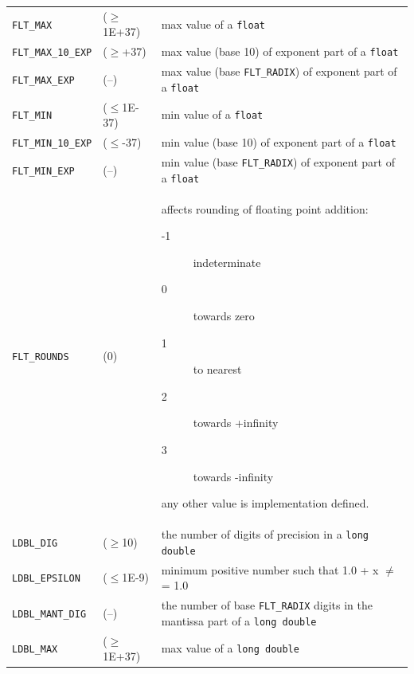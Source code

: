 \begin{tabular}{llp{\textwidth}}
     \texttt{FLT\_MAX} & ($\geq$1E+37) & max value of a \texttt{float}
    \\

     \texttt{FLT\_MAX\_10\_EXP} & ($\geq$+37) & max value (base 10) of exponent part of a \texttt{float}
    \\

     \texttt{FLT\_MAX\_EXP} & (--) & max value (base \texttt{FLT\_RADIX}) of exponent part of a
      \texttt{float}
    \\

     \texttt{FLT\_MIN} & ($\leq$1E-37) & min value of a \texttt{float}
    \\

     \texttt{FLT\_MIN\_10\_EXP} & ($\leq$-37) & min value (base 10) of exponent part of a \texttt{float}
    \\

     \texttt{FLT\_MIN\_EXP} & (--) & min value (base \texttt{FLT\_RADIX}) of exponent part of a
      \texttt{float}
    \\

     \texttt{FLT\_ROUNDS} & (0) & 
      affects rounding of floating point addition:

      \begin{description}
       \item[-1] indeterminate
       \item[0] towards zero
       \item[1] to nearest
       \item[2] towards +infinity
       \item[3] towards -infinity
      \end{description}
      any other value is implementation defined.

     
    \\

     \texttt{LDBL\_DIG} & ($\geq$10) & the number of digits of precision in a \texttt{long double}
    \\

     \texttt{LDBL\_EPSILON} & ($\leq$1E-9) & minimum positive number such that 1.0 + x $\neq$= 1.0
    \\

     \texttt{LDBL\_MANT\_DIG} & (--) & the number of base \texttt{FLT\_RADIX} digits in the mantissa part
      of a \texttt{long double}
    \\

     \texttt{LDBL\_MAX} & ($\geq$1E+37) & max value of a \texttt{long double}
    \\


\end{tabular}
